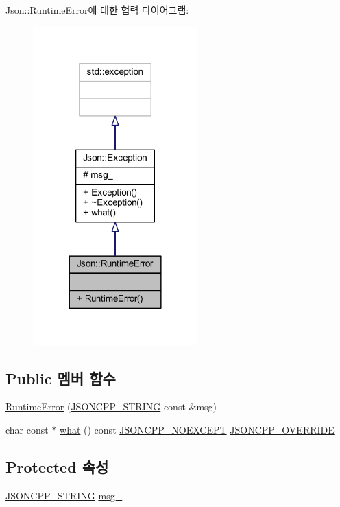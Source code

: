 Json\+:\+:Runtime\+Error에 대한 협력 다이어그램\+:\nopagebreak
\begin{figure}[H]
\begin{center}
\leavevmode
\includegraphics[width=180pt]{class_json_1_1_runtime_error__coll__graph}
\end{center}
\end{figure}
\subsection*{Public 멤버 함수}
\begin{DoxyCompactItemize}
\item 
\hyperlink{class_json_1_1_runtime_error_a0f6445dc345ce0a703610b6e893fee40}{Runtime\+Error} (\hyperlink{json_8h_a1e723f95759de062585bc4a8fd3fa4be}{J\+S\+O\+N\+C\+P\+P\+\_\+\+S\+T\+R\+I\+NG} const \&msg)
\item 
char const  $\ast$ \hyperlink{class_json_1_1_exception_a70b7ce35e761fb93e8cd338e04619cd6}{what} () const \hyperlink{json_8h_af8418c6d82d9de6e5f3c739fcf2fe88d}{J\+S\+O\+N\+C\+P\+P\+\_\+\+N\+O\+E\+X\+C\+E\+PT} \hyperlink{json_8h_a824d6199c91488107e443226fa6022c5}{J\+S\+O\+N\+C\+P\+P\+\_\+\+O\+V\+E\+R\+R\+I\+DE}
\end{DoxyCompactItemize}
\subsection*{Protected 속성}
\begin{DoxyCompactItemize}
\item 
\hyperlink{json_8h_a1e723f95759de062585bc4a8fd3fa4be}{J\+S\+O\+N\+C\+P\+P\+\_\+\+S\+T\+R\+I\+NG} \hyperlink{class_json_1_1_exception_aae3cbb8b45bf21480f64502a8329659f}{msg\+\_\+}
\end{DoxyCompactItemize}



